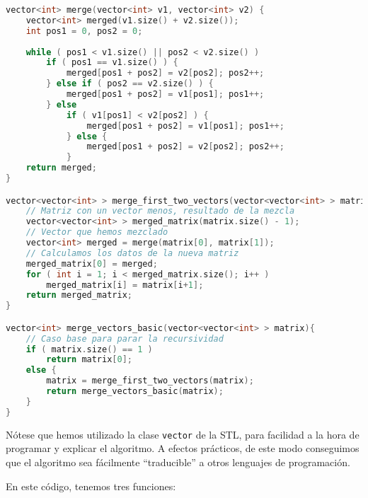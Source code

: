 \documentclass[10pt, a4paper]{article}
\theoremstyle{theorem-style}
\theoremstyle{theorem-style}
\theoremstyle{definition-style}
\theoremstyle{remark-style}
\theoremstyle{example-style}
\theoremstyle{definition-style}
\theoremstyle{remark-style}
\begin{document}
\begin{lstlisting}[language=C]
vector<int> merge(vector<int> v1, vector<int> v2) {
	vector<int> merged(v1.size() + v2.size());
	int pos1 = 0, pos2 = 0;
	
	while ( pos1 < v1.size() || pos2 < v2.size() )
		if ( pos1 == v1.size() ) {
			merged[pos1 + pos2] = v2[pos2]; pos2++;
		} else if ( pos2 == v2.size() ) {
			merged[pos1 + pos2] = v1[pos1];	pos1++;
		} else
			if ( v1[pos1] < v2[pos2] ) {
				merged[pos1 + pos2] = v1[pos1]; pos1++;
			} else {
				merged[pos1 + pos2] = v2[pos2]; pos2++;
			}
	return merged;
}

vector<vector<int> > merge_first_two_vectors(vector<vector<int> > matrix) {
	// Matriz con un vector menos, resultado de la mezcla
	vector<vector<int> > merged_matrix(matrix.size() - 1);
	// Vector que hemos mezclado
	vector<int> merged = merge(matrix[0], matrix[1]);
	// Calculamos los datos de la nueva matriz
	merged_matrix[0] = merged;
	for ( int i = 1; i < merged_matrix.size(); i++ )
		merged_matrix[i] = matrix[i+1];
	return merged_matrix;
}

vector<int> merge_vectors_basic(vector<vector<int> > matrix){
	// Caso base para parar la recursividad
	if ( matrix.size() == 1 )
		return matrix[0];	
	else {
		matrix = merge_first_two_vectors(matrix);
		return merge_vectors_basic(matrix);
	}
}
\end{lstlisting}

Nótese que hemos utilizado la clase \texttt{vector} de la STL, para facilidad a la hora de programar y explicar el algoritmo. A efectos prácticos, de este modo conseguimos que el algoritmo sea fácilmente ``traducible'' a otros lenguajes de programación.

En este código, tenemos tres funciones:
\end{document}
